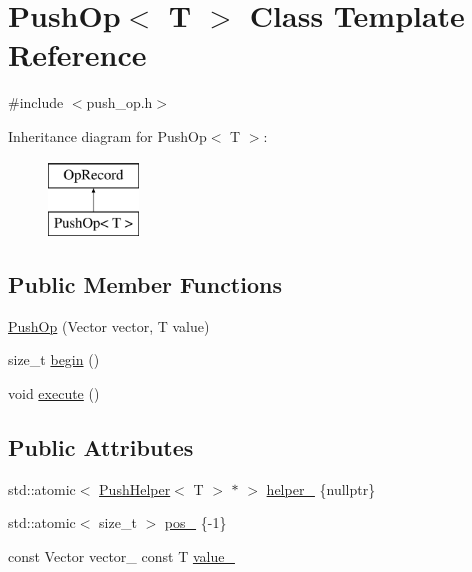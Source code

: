 \hypertarget{class_push_op}{}\section{Push\+Op$<$ T $>$ Class Template Reference}
\label{class_push_op}


{\ttfamily \#include $<$push\+\_\+op.\+h$>$}

Inheritance diagram for Push\+Op$<$ T $>$\+:\begin{figure}[H]
\begin{center}
\leavevmode
\includegraphics[height=2.000000cm]{class_push_op}
\end{center}
\end{figure}
\subsection*{Public Member Functions}
\begin{DoxyCompactItemize}
\item 
\hyperlink{class_push_op_afcac5a846e52a1f6b168dda598d3baa3}{Push\+Op} (Vector vector, T value)
\item 
size\+\_\+t \hyperlink{class_push_op_a97f81fb7d200909bdeb6e8346b8f485f}{begin} ()
\item 
void \hyperlink{class_push_op_a8a78c3baaa55f3b865910024c345176e}{execute} ()
\end{DoxyCompactItemize}
\subsection*{Public Attributes}
\begin{DoxyCompactItemize}
\item 
std\+::atomic$<$ \hyperlink{class_push_helper}{Push\+Helper}$<$ T $>$ $\ast$ $>$ \hyperlink{class_push_op_a1178c6780368c2f964386abc81f90298}{helper\+\_\+} \{nullptr\}
\item 
std\+::atomic$<$ size\+\_\+t $>$ \hyperlink{class_push_op_a0e4c04016077802998713feb9e5dc6fb}{pos\+\_\+} \{-\/1\}
\item 
const Vector vector\+\_\+ const T \hyperlink{class_push_op_af5df9efc25c3879d9178ccf9282de290}{value\+\_\+}
\end{DoxyCompactItemize}


